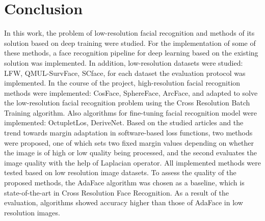 \documentclass[11pt,a4paper]{article}
\begin{document}
\section{Conclusion}
In this work, the problem of low-resolution facial recognition and methods of its solution based on deep training were studied. For the implementation of some of these methods, a face recognition pipeline for deep learning based on the existing solution was implemented. In addition, low-resolution datasets were studied: LFW, QMUL-SurvFace, SCface, for each dataset the evaluation protocol was implemented. In the course of the project, high-resolution facial recognition methods were implemented: CosFace, SphereFace, ArcFace, and adapted to solve the low-resolution facial recognition problem using the Cross Resolution Batch Training algorithm. Also algorithms for fine-tuning facial recognition model were implemented: OctupletLos, DeriveNet. Based on the studied articles and the trend towards margin adaptation in software-based loss functions, two methods were proposed, one of which sets two fixed margin values depending on whether the image is of high or low quality being processed, and the second evaluates the image quality with the help of Laplacian operator. All implemented methods were tested based on low resolution image datasets. To assess the quality of the proposed methods, the AdaFace algorithm was chosen as a baseline, which is state-of-the-art in Cross Resolution Face Recognition. As a result of the evaluation, algorithms showed accuracy higher than those of AdaFace in low resolution images. 

\newpage








\end{document}
